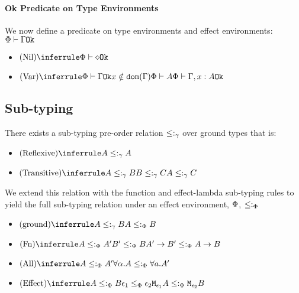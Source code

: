 {    \paragraph{Ok Predicate on Type Environments}
    We now define a predicate on type environments and effect environments: $\oke{\P}{\G}$
    
    \begin{itemize}
        \item $\ntreerulez{Nil}{\oke{\P}{\nil}}$
        \item $\ntreeruleII{Var}{\oke{\P}{\G}}{ x\notin\dom{\G}}{ \wellformed{\P}{A}}{\oke{\P}{\gax}}$
    \end{itemize}
    
    
    
    \subsection{Sub-typing}
        There exists a sub-typing pre-order relation $\subtype_{\ground}$ over ground types that is:
        \begin{itemize}
            \item $\ntreerulez{Reflexive}{A \subtype_{\ground} A}$
            \item $\ntreeruleII{Transitive}{A \subtype_{\ground} B }{ B \subtype_{\ground} C}{A \subtype_{\ground} C}$
        \end{itemize}
    
        We extend this relation with the function and effect-lambda sub-typing rules to yield the full sub-typing relation under an effect environment, $\P$, $\subtypep$
    
        \begin{itemize}
            \item $\ntreeruleI{ground}{A \subtype_{\ground} B}{A \subtypep B}$
            \item $\ntreeruleII{Fn}{A \subtypep A' }{ B' \subtypep B }{\fntype{A'}{B'} \subtypep \ab}$
            \item $\ntreeruleI{All}{A\subtypep A'}{\all{\a}{A}\subtypep\all{a}{A'}}$
            \item $\ntreeruleII{Effect}{A\subtypep B}{ \e_1\subeffectp\e_2}{\M{\e_1}{A}\subtypep\M{\e_2}{B}}$
        \end{itemize}
    
}

